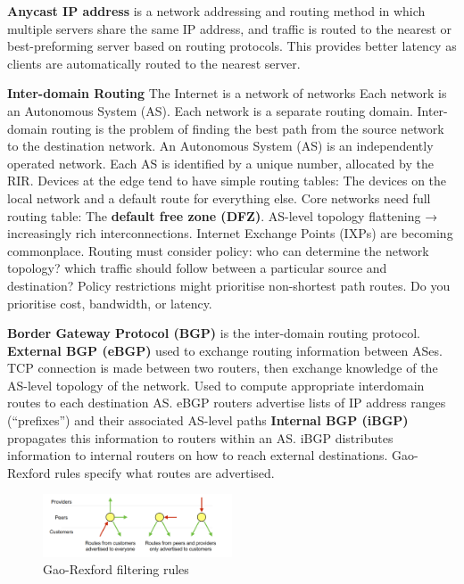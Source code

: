 \documentclass{article}
\begin{document}
\textbf{Anycast IP address} is a network addressing and routing method in which multiple servers share the same IP address,
and traffic is routed to the nearest or best-preforming server based on routing protocols.
This provides better latency as clients are automatically routed to the nearest server.


\vspace{\baselineskip}
\textbf{Inter-domain Routing}
The Internet is a network of networks
Each network is an Autonomous System (AS).
Each network is a separate routing domain.
Inter-domain routing is the problem of finding the best path from the source network to the destination network.
An Autonomous System (AS) is an independently operated network.
Each AS is identified by a unique number, allocated by the RIR\@.
Devices at the edge tend to have simple routing tables: The devices on the local network and a default route for everything else.
Core networks need full routing table: The \textbf{default free zone (DFZ)}.
AS-level topology flattening → increasingly rich interconnections.
Internet Exchange Points (IXPs) are becoming commonplace.
Routing must consider policy: who can determine the network topology? which traffic should follow between a particular source and destination?
Policy restrictions might prioritise non-shortest path routes. Do you prioritise cost, bandwidth, or latency.

\textbf{Border Gateway Protocol (BGP)} is the inter-domain routing protocol.
\textbf{External BGP (eBGP)} used to exchange routing information between ASes.
TCP connection is made between two routers, then exchange knowledge of the AS-level topology of the network.
Used to compute appropriate interdomain routes to each destination AS\@.
eBGP routers advertise lists of IP address ranges (“prefixes”) and their associated AS-level paths
\textbf{Internal BGP (iBGP)} propagates this information to routers within an AS\@.
iBGP distributes information to internal routers on how to reach external destinations.
Gao-Rexford rules specify what routes are advertised.

\begin{figure}[h]
    \centering
    \includegraphics[width=0.5\textwidth]{assets/gao-rexford-filtering-rules.png}
    \caption{Gao-Rexford filtering rules}\label{fig:gao-rexford}
\end{figure}
\end{document}
